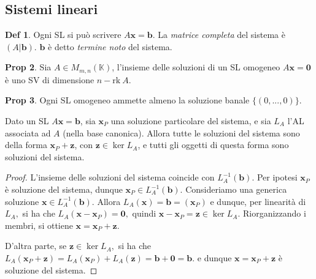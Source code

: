 \documentclass[]{article}
\newcommand{\bl}[1]{\mathbf{#1}}
\newcommand{\vb}{\mathbf{b}}
\theoremstyle{definition}
\theoremstyle{definition}
\newtheorem{prop}{Prop}[subsection]
\theoremstyle{definition}
\newtheorem{dfn}[prop]{Def}
\begin{document}
\subsection{Sistemi lineari} 

\begin{dfn} Ogni SL si può scrivere $A \bl{x}= \bl{b}$. La \emph{matrice completa} del sistema è $(A|\bl{b})$. $\bl{b}$ è detto \emph{termine noto} del sistema.  

\end{dfn} \begin{prop} Sia $A \in M_{m,n}(\mathbb{K})$, l'insieme delle soluzioni di un SL omogeneo $A \bl{x} =\bl{0}$ è uno SV di dimensione $n-\mathrm{rk}\ A$.

\end{prop} \begin{prop} Ogni SL omogeneo ammette almeno la soluzione banale $\{(0,...,0)\}$.

\end{prop} 

\begin{thm}
 Dato un SL $A \bl{x}= \bl{b}$, sia $\bl{x}_P$ una soluzione particolare del sistema, e sia $L_A$ l'AL associata ad $A$ (nella base canonica). Allora tutte le soluzioni del sistema sono della forma $\bl{x}_P + \bl{z}$, con $\bl{z} \in \ker L_A$, e tutti gli oggetti di questa forma sono soluzioni del sistema.
\end{thm}
\begin{proof}
L'insieme delle soluzioni del sistema coincide con $L_A^{-1}(\vb).$ Per ipotesi $\bl{x}_P$ è soluzione del sistema, dunque $\bl{x}_P \in L_A^{-1}(\vb).$ Consideriamo una generica soluzione $\bl{x} \in L_A^{-1}(\vb).$ Allora $L_A(\bl{x})=\vb=(\bl{x}_P)$ e dunque, per linearità di $L_A,$ si ha che $L_A(\bl{x}-\bl{x}_P)=\bl{0},$ quindi $\bl{x}-\bl{x}_P=\bl{z} \in \ker L_A.$ Riorganizzando i membri, si ottiene $\bl{x}=\bl{x}_P + \bl{z}$.

D'altra parte, se $\bl{z} \in \ker L_A,$ si ha che $L_A(\bl{x}_P+\bl{z})=L_A(\bl{x}_P)+L_A(\bl{z})=\vb+\bl{0}=\vb.$ e dunque $\bl{x}=\bl{x}_P+\bl{z}$ è soluzione del sistema.
\end{proof}
\end{document}
